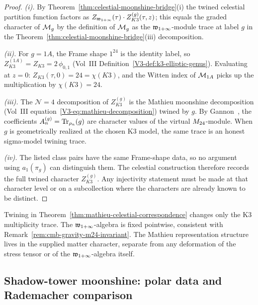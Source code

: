 \begin{proof}
\emph{(i).}
By Theorem~\ref{thm:celestial-moonshine-bridge}(i) the twined celestial
partition function factors as $Z_{\mathfrak w_{1+\infty}}(\tau) \cdot Z_{K3}^{(g)}(\tau,
z)$; this equals the graded character of $\mathcal M_g$ by the definition of
$\mathcal M_g$ as the $\mathfrak w_{1+\infty}$-module trace at label $g$ in the
Theorem~\ref{thm:celestial-moonshine-bridge}(iii) decomposition.

\emph{(ii).}
For $g = 1A$, the Frame shape $1^{24}$ is the identity label, so
$Z_{K3}^{(1A)} = Z_{K3} = 2\,\phi_{0,1}$
(Vol~III Definition~\ref{V3-def:k3-elliptic-genus}). Evaluating at
$z = 0$: $Z_{K3}(\tau, 0) = 24 = \chi(K3)$, and the Witten index of
$\mathcal M_{1A}$ picks up the multiplication by $\chi(K3) = 24$.

\emph{(iii).}
The $\mathcal{N}{=}4$ decomposition of \(Z_{K3}^{(g)}\) is the Mathieu
moonshine decomposition
(Vol~III equation~\eqref{V3-eq:mathieu-decomposition}) twined by \(g\).
By Gannon~\cite{Gannon16}, the coefficients
\(A_n^{(g)}=\operatorname{Tr}_{\rho_n}(g)\) are character values of the virtual
\(M_{24}\)-module. When \(g\) is geometrically realized at the chosen
K3 model, the same trace is an honest sigma-model twining trace.

\emph{(iv).}
The listed class pairs have the same Frame-shape data, so no argument
using \(a_1(\pi_g)\) can distinguish them.  The celestial construction
therefore records the full twined character \(Z_{K3}^{(g)}\).  Any
injectivity statement must be made at that character level or on a
subcollection where the characters are already known to be distinct.
\end{proof}

\begin{remark}
\label{rem:cmb-permutation-not-deformation}
Twining in Theorem~\ref{thm:mathieu-celestial-correspondence} changes
only the K3 multiplicity trace.  The $\mathfrak w_{1+\infty}$-algebra is fixed pointwise,
consistent with Remark~\ref{rem:cmb-gravity-m24-invariant}.  The
Mathieu representation structure lives in the supplied matter
character, separate from any deformation of the stress tensor or of
the $\mathfrak w_{1+\infty}$-algebra itself.
\end{remark}

\subsection{Shadow-tower moonshine: polar data and Rademacher comparison}
\label{subsec:cmb-shadow}

